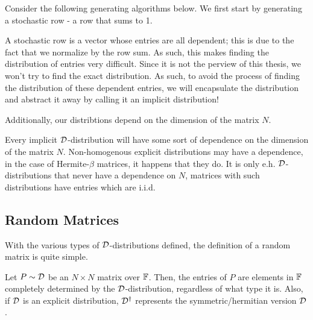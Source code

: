 Consider the following generating algorithms below. We first start by generating a stochastic row - a row that sums to 1.

\ALGstochrow

\ALGstoch

\begin{remark}
A stochastic row is a vector whose entries are all dependent; this is due to the fact that we normalize by the row sum.
As such, this makes finding the distribution of entries very difficult. Since it is not the perview of this thesis, we won't try to find the exact distribution.
As such, to avoid the process of finding the distribution of these dependent entries, we will encapsulate the distribution and abstract it away by calling it an implicit distribution!
\end{remark}

Additionally, our distribtions depend on the dimension of the matrix $N$.

\begin{remark}[Dependence on $N$]
Every implicit $\mathcal{D}$-distribution will have some sort of dependence on the dimension of the matrix $N$.
Non-homogenous explicit distributions may have a dependence, in the case of Hermite-$\beta$ matrices, it happens that they do.
It is only e.h. $\mathcal{D}$-distributions that never have a dependence on $N$, matrices with such distributions have entries which are i.i.d.
\end{remark}


\subsection{Random Matrices}

With the various types of $\mathcal{D}$-distributions defined, the definition of a random matrix is quite simple.

\begin{definition}
Let $P \sim \mathcal{D}$ be an $N \times N$ matrix over $\mathbb{F}$. Then, the entries of $P$ are elements in $\mathbb{F}$ completely determined by the $\mathcal{D}$-distribution, regardless of what type it is.
Also, if $\mathcal{D}$ is an explicit distribution, $\mathcal{D}^\dagger$ represents the symmetric/hermitian version $\mathcal{D}$.
\end{definition}


